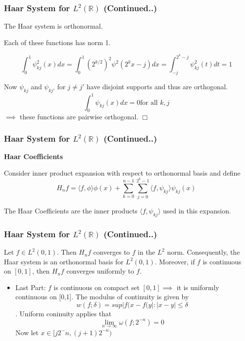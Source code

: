 \documentclass{beamer}
\newcommand{\qedwhite}{\hfill \ensuremath{\Box}}
\begin{document}
\begin{frame}
\frametitle{Haar System for  $L^2\left({\mathbb{R}}\right)$ (Continued..)}

\begin{lemma}[15.2.1]
    The Haar system is orthonormal.
\end{lemma}


Each of these functions has norm 1. 

$$\int_0^1\psi_{kj}^2(x)dx = \int_0^1 (2^{k/2})^2\psi^2(2^kx-j)dx = \int_{-j}^{2^k-j} \psi_{kj}^2(t)dt = 1$$


Now $\psi_{kj}$ and $\psi_{kj'}$ for $j \ne j'$ have disjoint supports and thus are orthogonal. 
$$\int_0^1\psi_{kj}(x)dx = 0 \text{for all } k, j$$
$\implies$ these functions are pairwise orthogonal.
\qedwhite
\end{frame}

\begin{frame}
\frametitle{Haar System for  $L^2\left({\mathbb{R}}\right)$ (Continued..)}
\textbf{Haar Coefficients}
\linebreak

Consider inner product expansion with respect to orthonormal basis and define
    $$H_nf = \langle f, \phi\rangle \phi(x) + \sum_{k=0}^{n-1}  \sum_{j=0}^{2^k-1} \langle f, \psi_{kj}\rangle \psi_{kj}(x)$$

The Haar Coefficients are the inner products $\langle f, \psi_{kj}\rangle$ used in this expansion.
\end{frame}

\begin{frame}
    \frametitle{Haar System for  $L^2\left({\mathbb{R}}\right)$ (Continued..)}

\begin{theorem}[15.2.3]
    Let $f \in L^2(0,1)$. Then $H_nf$ converges to $f$ in the $L^2$ norm.
    Consequently, the Haar system is an orthonormal basis for $L^2(0,1)$. 
    Moreover, if $f$ is continuous on $[0, 1]$, then $H_nf$ converges uniformly to $f$.
\end{theorem}


\begin{itemize}
    \item Last Part: $f$ is continuous on compact set $[0,1] \implies$ it is uniformly continuous on [0,1].
    The modulus of continuity is  given  by $$w(f;\delta)  = sup{|f(x-f(y| : |x - y| \le \delta}$$. 
    Uniform coninuity applies that $$\lim_{n \to \infty} \omega(f;2^{-n})=0$$
    Now let $x \in [j2^-n, (j+1)2^{-n})$
\end{itemize}

\end{frame}
\end{document}
